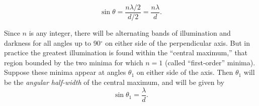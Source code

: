 \begin{equation*}
\sin \theta = \frac{n\lambda/2}{d/2} = \frac{n\lambda}{d}.
\end{equation*}

Since $n$ is any integer, there will be alternating bands of
illumination and darkness for all angles up to 90$^\circ$ on either side of the
perpendicular axis. But in practice the greatest illumination is found
within the ``central maximum,'' that region bounded by the two minima
for which $n = 1$ (called ``first-order'' minima). Suppose these
minima appear at angles $\theta_1$ on either side of the axis. Then
$\theta_1$ will be the \emph{angular half-width} of the central maximum,
and will be given by
\begin{equation*}\label{eq:diffraction}
\sin \theta_1 = \frac{\lambda}{d}.
\end{equation*}

